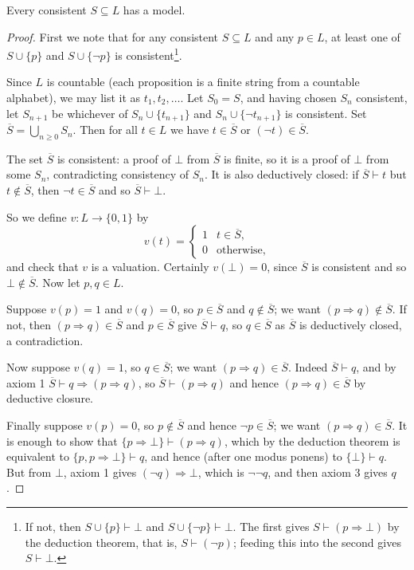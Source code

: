 \documentclass[a4paper]{scrartcl}
\begin{document}
\begin{theorem}\label{thm:propmodelexistence}
Every consistent $S \subseteq L$ has a model.
\end{theorem}
\begin{proof}
  First we note that for any consistent $S \subseteq L$ and any $p \in L$, at least one of $S \cup \{p\}$ and $S \cup \{\lnot p\}$ is consistent\footnote{If not, then $S \cup \{p\} \vdash \bot$ and $S \cup \{\lnot p\} \vdash \bot$. The first gives $S \vdash (p \Rightarrow \bot)$ by the deduction theorem, that is, $S \vdash (\lnot p)$; feeding this into the second gives $S \vdash \bot$.}.

  Since $L$ is countable (each proposition is a finite string from a countable alphabet), we may list it as $t_1, t_2, \dots$. Let $S_0 = S$, and having chosen $S_n$ consistent, let $S_{n+1}$ be whichever of $S_n \cup \{t_{n+1}\}$ and $S_n \cup \{\lnot t_{n+1}\}$ is consistent. Set $\overline{S} = \bigcup_{n \geq 0} S_n$. Then for all $t \in L$ we have $t \in \overline{S}$ or $(\lnot t) \in \overline{S}$.

  The set $\overline{S}$ is consistent: a proof of $\bot$ from $\overline S$ is finite, so it is a proof of $\bot$ from some $S_n$, contradicting consistency of $S_n$. It is also deductively closed: if $\overline S \vdash t$ but $t \notin \overline S$, then $\lnot t \in \overline S$ and so $\overline S \vdash \bot$.

  So we define $v: L \rightarrow \{0, 1\}$ by
  $$
  v(t) = \begin{cases}
        1 & t \in \overline{S},\\
        0 & \text{otherwise,}
       \end{cases}
  $$
  and check that $v$ is a valuation. Certainly $v(\bot) = 0$, since $\overline{S}$ is consistent and so $\bot \notin \overline{S}$. Now let $p, q \in L$.

  Suppose $v(p) = 1$ and $v(q) = 0$, so $p \in \overline S$ and $q \notin \overline S$; we want $(p \Rightarrow q) \notin \overline{S}$. If not, then $(p \Rightarrow q) \in \overline S$ and $p \in \overline S$ give $\overline S \vdash q$, so $q \in \overline S$ as $\overline S$ is deductively closed, a contradiction.

  Now suppose $v(q) = 1$, so $q \in \overline S$; we want $(p \Rightarrow q) \in \overline S$. Indeed $\overline{S} \vdash q$, and by axiom 1 $\overline{S} \vdash q \Rightarrow(p \Rightarrow q)$, so $\overline S \vdash (p \Rightarrow q)$ and hence $(p \Rightarrow q) \in \overline S$ by deductive closure.

  Finally suppose $v(p) = 0$, so $p \notin \overline S$ and hence $\lnot p \in \overline{S}$; we want $(p \Rightarrow q) \in \overline S$. It is enough to show that $\{p \Rightarrow \bot\} \vdash (p \Rightarrow q)$, which by the deduction theorem is equivalent to $\{p, p \Rightarrow \bot\} \vdash q$, and hence (after one modus ponens) to $\{\bot\} \vdash q$. But from $\bot$, axiom 1 gives $(\lnot q) \Rightarrow \bot$, which is $\lnot\lnot q$, and then axiom 3 gives $q$.
\end{proof}
\end{document}
